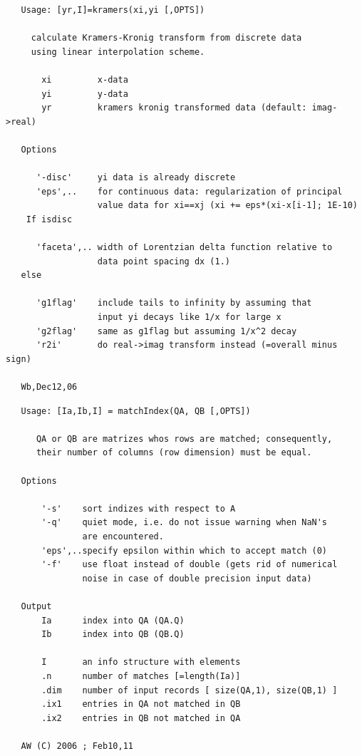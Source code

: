 \documentclass[twoside,12pt]{article}
\begin{document}
\begin{verbatim}
   Usage: [yr,I]=kramers(xi,yi [,OPTS])
 
     calculate Kramers-Kronig transform from discrete data
     using linear interpolation scheme.
 
       xi         x-data
       yi         y-data
       yr         kramers kronig transformed data (default: imag->real)
 
   Options
 
      '-disc'     yi data is already discrete
      'eps',..    for continuous data: regularization of principal
                  value data for xi==xj (xi += eps*(xi-x[i-1]; 1E-10)
    If isdisc
 
      'faceta',.. width of Lorentzian delta function relative to
                  data point spacing dx (1.)
   else
 
      'g1flag'    include tails to infinity by assuming that
                  input yi decays like 1/x for large x
      'g2flag'    same as g1flag but assuming 1/x^2 decay
      'r2i'       do real->imag transform instead (=overall minus sign)
 
   Wb,Dec12,06
\end{verbatim}

\pagebreak[3]



\begin{verbatim}
   Usage: [Ia,Ib,I] = matchIndex(QA, QB [,OPTS])
 
      QA or QB are matrizes whos rows are matched; consequently, 
      their number of columns (row dimension) must be equal.
 
   Options
 
       '-s'    sort indizes with respect to A
       '-q'    quiet mode, i.e. do not issue warning when NaN's
               are encountered.
       'eps',..specify epsilon within which to accept match (0)
       '-f'    use float instead of double (gets rid of numerical
               noise in case of double precision input data)
 
   Output
       Ia      index into QA (QA.Q)
       Ib      index into QB (QB.Q)
 
       I       an info structure with elements
       .n      number of matches [=length(Ia)]
       .dim    number of input records [ size(QA,1), size(QB,1) ]
       .ix1    entries in QA not matched in QB
       .ix2    entries in QB not matched in QA
 
   AW (C) 2006 ; Feb10,11
\end{verbatim}
\end{document}
